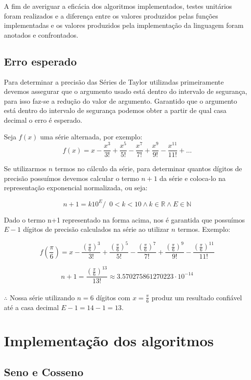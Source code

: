 \documentclass[12pt]{article}
\begin{document}
A fim de averiguar a eficácia dos algoritmos implementados, testes unitários foram realizados e a diferença entre os valores produzidos pelas funções implementadas e os valores produzidos pela implementação da linguagem foram anotados e confrontados.

\subsection{Erro esperado}
Para determinar a precisão das Séries de Taylor utilizadas primeiramente devemos assegurar que o argumento usado está dentro do intervalo de segurança, para isso faz-se a redução do valor de argumento. Garantido que o argumento está dentro do intervalo de segurança podemos obter a partir de qual casa decimal o erro é esperado. 

Seja $f(x)$ uma série alternada, por exemplo: $$f(x) = x - \frac{x^3}{3!} + \frac{x^5}{5!} - \frac{x^7}{7!} + \frac{x^9}{9!} - \frac{x^{11}}{11!} +  \ldots$$

Se utilizarmos $n$ termos no cálculo da série, para determinar quantos dígitos de precisão possuímos devemos calcular o termo $n+1$ da série e coloca-lo na representação exponencial normalizada, ou seja:

$$n+1 = k10^{E} /\,\,\,0 < k < 10 \land k \in \mathbb{R} \land E \in \mathbb{N}$$

Dado o termo n+1 representado na forma acima, nos é garantida que possuímos $E-1$ dígitos de precisão calculados na série ao utilizar $n$ termos. Exemplo:

$$f(\frac{\pi}{6}) = x - \frac{(\frac{\pi}{6})^3}{3!} + \frac{(\frac{\pi}{6})^5}{5!} - \frac{(\frac{\pi}{6})^7}{7!} + \frac{(\frac{\pi}{6})^9}{9!} - \frac{(\frac{\pi}{6})^{11}}{11!}$$

$$n+1=\frac{(\frac{\pi}{6})^{13}}{13!} \approx 3.570275861270223 \cdot 10^{-14}$$
\\
$\therefore$ Nossa série utilizando $n=6$ dígitos com $x=\frac{\pi}{6}$ produz um resultado confiável até a casa decimal $E - 1= 14 -1= 13$.

\newpage
\section{Implementação dos algoritmos}

\subsection{Seno e Cosseno}
\end{document}
